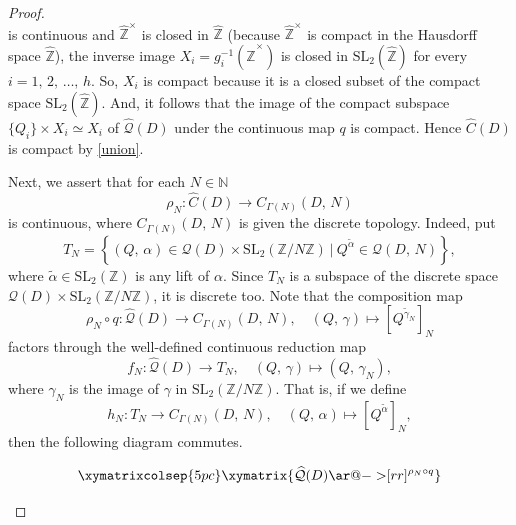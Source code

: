\documentclass[reqno,11pt]{article}
\theoremstyle{plain} %
\theoremstyle{definition} %
\begin{document}
\begin{proof}
\begin{equation*}
\end{equation*}
is continuous and 
$\widehat{\mathbb{Z}}^\times$ is closed in 
$\widehat{\mathbb{Z}}$ (because
$\widehat{\mathbb{Z}}^\times$ is compact in the Hausdorff space 
$\widehat{\mathbb{Z}}$), the inverse image $X_i=g_i^{-1}(\widehat{\mathbb{Z}}^\times)$
is closed in $\mathrm{SL}_2(\widehat{\mathbb{Z}})$ for every $i=1,\,2,\,\ldots,\,h$.
So, $X_i$ is compact because it is a closed subset of
the compact space $\mathrm{SL}_2(\widehat{\mathbb{Z}})$.
And, it follows that the image of the compact subspace $\{Q_i\}\times X_i
\simeq X_i$
of $\widehat{\mathcal{Q}}(D)$
under the continuous map $q$ is compact. 
Hence $\widehat{C}(D)$ is compact by \eqref{union}.
\par
Next, we assert that for each $N\in\mathbb{N}$
\begin{equation*}
\rho_N:\widehat{C}(D)\rightarrow C_{\Gamma(N)}(D,\,N)
\end{equation*}
is continuous, where $C_{\Gamma(N)}(D,\,N)$ is given the discrete
topology. 
Indeed, put
\begin{equation*}
T_N=\left\{(Q,\,\alpha)\in\mathcal{Q}(D)\times
\mathrm{SL}_2(\mathbb{Z}/N\mathbb{Z})~|~
Q^{\widetilde{\alpha}}\in\mathcal{Q}(D,\,N)\right\},
\end{equation*}
where $\widetilde{\alpha}\in\mathrm{SL}_2(\mathbb{Z})$ is any lift of $\alpha$. 
Since $T_N$ is a subspace of the discrete space $\mathcal{Q}(D)\times
\mathrm{SL}_2(\mathbb{Z}/N\mathbb{Z})$, it is discrete too. 
Note that the composition map
\begin{equation*}
\rho_N\circ q:\widehat{\mathcal{Q}}(D)
\rightarrow C_{\Gamma(N)}(D,\,N),
\quad (Q,\,\gamma)\mapsto[Q^{\widetilde{\gamma}_N}]_N
\end{equation*}
factors through the well-defined continuous reduction map
\begin{equation*}
f_N:\widehat{\mathcal{Q}}(D)\rightarrow
T_N,\quad
(Q,\,\gamma)\mapsto (Q,\,\gamma_N),
\end{equation*}
where $\gamma_N$ is the image of $\gamma$ in $\mathrm{SL}_2(\mathbb{Z}/N\mathbb{Z})$. 
That is, if we define
\begin{equation*}
h_N:T_N\rightarrow C_{\Gamma(N)}(D,\,N),
\quad
(Q,\,\alpha)\mapsto[Q^{\widetilde{\alpha}}]_N,
\end{equation*}
then the following diagram commutes. 
\begin{figure}[H]
\begin{equation*}
\xymatrixcolsep{5pc}
\xymatrix{
\widehat{\mathcal{Q}}(D)\ar@{->}[rr]^{\rho_N\circ q}
}
\end{equation*}
\end{figure}
\end{proof}
\end{document}
